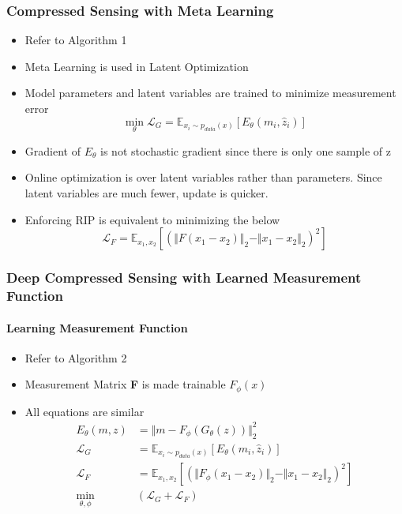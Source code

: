 \documentclass{article}
\begin{document}
    \subsubsection{Compressed Sensing with Meta Learning}\label{subsubsec:Deep_Compressed_Sensing:csml}
    \begin{itemize}
        \item Refer to Algorithm 1
        \item Meta Learning is used in Latent Optimization
        \item Model parameters and latent variables are trained to minimize measurement error
        \[\min_\theta \mathcal{L}_G = \mathbb{E}_{x_i \sim p_{data}(x)} \left[ E_\theta(m_i, \hat{z}_i) \right]\]
        \item Gradient of $E_\theta$ is not stochastic gradient since there is only one sample of z
        \item Online optimization is over latent variables rather than parameters.
        Since latent variables are much fewer, update is quicker.
        \item Enforcing RIP is equivalent to minimizing the below
        \[\mathcal{L}_F = \mathbb{E}_{x_1,x_2}\left[(\Vert{F(x_1-x_2)}\Vert_2 - \Vert{x_1-x_2}\Vert_2)^2\right]\]
    \end{itemize}

    \subsubsection{Deep Compressed Sensing with Learned Measurement Function}\label{subsubsec:Deep_Compressed_Sensing:dcs-learned-measurement}

    \paragraph{Learning Measurement Function}
    \begin{itemize}
        \item Refer to Algorithm 2
        \item Measurement Matrix \textbf{F} is made trainable $F_\phi(x)$
        \item All equations are similar
        \begin{align*}
            E_\theta(m,z) &= \Vert {m-F_\phi(G_\theta(z))} \Vert_2^2 \\
            \mathcal{L}_G &= \mathbb{E}_{x_i \sim p_{data}(x)} \left[ E_\theta(m_i, \hat{z}_i) \right] \\
            \mathcal{L}_F &= \mathbb{E}_{x_1,x_2}\left[(\Vert{F_\phi(x_1-x_2)}\Vert_2 - \Vert{x_1-x_2}\Vert_2)^2\right] \\
            \min_{\theta, \phi} & (\mathcal{L}_G + \mathcal{L}_F)
        \end{align*}
    \end{itemize}
\end{document}
